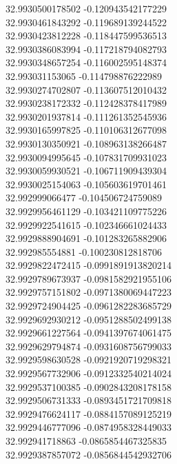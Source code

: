 {32.9930500178502	-0.120943542177229\\
32.9930461843292	-0.119689139244522\\
32.9930423812228	-0.118447599536513\\
32.9930386083994	-0.117218794082793\\
32.9930348657254	-0.116002595148374\\
32.993031153065	-0.114798876222989\\
32.9930274702807	-0.113607512010432\\
32.9930238172332	-0.112428378417989\\
32.9930201937814	-0.111261352545936\\
32.9930165997825	-0.110106312677098\\
32.9930130350921	-0.108963138266487\\
32.9930094995645	-0.107831709931023\\
32.9930059930521	-0.106711909439304\\
32.9930025154063	-0.105603619701461\\
32.992999066477	-0.104506724759089\\
32.9929956461129	-0.103421109775226\\
32.9929922541615	-0.102346661024433\\
32.9929888904691	-0.101283265882906\\
32.992985554881	-0.100230812818706\\
32.9929822472415	-0.0991891913820214\\
32.9929789673937	-0.0981582921955106\\
32.9929757151802	-0.0971380069447223\\
32.9929724904425	-0.0961282283685729\\
32.9929692930212	-0.0951288502499138\\
32.9929661227564	-0.0941397674061475\\
32.9929629794874	-0.0931608756799033\\
32.9929598630528	-0.0921920719298321\\
32.9929567732906	-0.0912332540214024\\
32.9929537100385	-0.0902843208178158\\
32.9929506731333	-0.0893451721709818\\
32.9929476624117	-0.0884157089125219\\
32.9929446777096	-0.0874958328449033\\
32.992941718863	-0.0865854467325835\\
32.9929387857072	-0.0856844542932706\\
}
